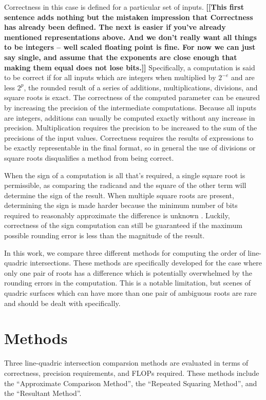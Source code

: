 \documentclass{cccg16}
\def\Jack#1{{\bf [[#1]]}\ignorespaces}
\begin{document}
Correctness in this case is defined for a particular set of
inputs. \Jack{This first sentence adds nothing but the mistaken
  impression that Correctness has already been defined.  The next is
  easier if you've already mentioned representations above.  And we
  don't really want all things to be integers -- well scaled floating
  point is fine.  For now we can just say single, and assume that the
  exponents are close enough that making them equal does not lose
  bits.}  Specifically, a computation is said to be correct if for all
inputs which are integers when multiplied by $2^{-e}$ and are less
$2^p$, the rounded result of a series of additions, multiplications,
divisions, and square roots is exact.  The correctness of the computed
parameter can be ensured by increasing the precision of the
intermediate computations.  Because all inputs are integers, additions
can usually be computed exactly without any increase in precision.
Multiplication requires the precision to be increased to the sum of
the precisions of the input values.
Correctness requires the results of expressions to be exactly
representable in the final format, so in general the use of divisions
or square roots disqualifies a method from being correct.

When the sign of a computation is all that's required, a single square
root is permissible, as comparing the radicand and the square of the
other term will determine the sign of the result.
When multiple square roots are present, determining the sign is made
harder because the minimum number of bits required to reasonably
approximate the difference is unknown \cite{demaine33open}.  Luckily,
correctness of the sign computation can still be guaranteed if the
maximum possible rounding error is less than the magnitude of the
result.

In this work, we compare three different methods for computing the
order of line-quadric intersections.  These methods are specifically
developed for the case where only one pair of roots has a difference
which is potentially overwhelmed by the rounding errors in the
computation.  This is a notable limitation, but scenes of quadric
surfaces which can have more than one pair of ambiguous roots are rare
and should be dealt with specifically.

\section{Methods}
Three line-quadric intersection comparsion methods are evaluated in
terms of correctness, precision requirements, and FLOPs required.
These methods include the ``Approximate Comparison Method'', the
``Repeated Squaring Method'', and the ``Resultant Method''.
\end{document}

